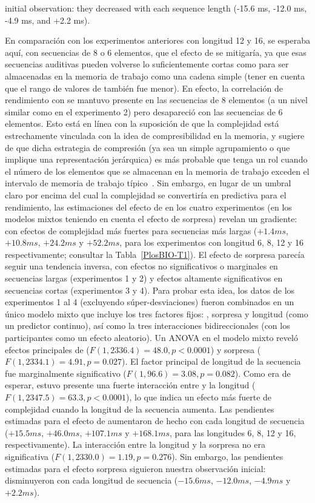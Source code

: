 initial observation: they decreased with each sequence length (-15.6 ms, -12.0 ms, -4.9 ms, and +2.2 ms).

En comparación con los experimentos anteriores con longitud 12 y 16, se esperaba aquí, con secuencias de 8 o 6 elementos, que el efecto de \mdlbin se mitigaría, ya que esas secuencias auditivas pueden volverse lo suficientemente cortas como para ser almacenadas en la memoria de trabajo como una cadena simple (tener en cuenta que el rango de valores de \mdlbin también fue menor). En efecto, la correlación de rendimiento con \mdlbin se mantuvo presente en las secuencias de 8 elementos (a un nivel similar como en el experimento 2) pero desapareció con las secuencias de 6 elementos. Esto está en línea con la suposición de que la complejidad está estrechamente vinculada con la idea de compresibilidad en la memoria, y sugiere de que dicha estrategia de compresión (ya sea un simple agrupamiento o que implique una representación jerárquica) es más probable que tenga un rol cuando el número de los elementos que se almacenan en la memoria de trabajo exceden el intervalo de memoria de trabajo típico~\cite{f16,f89}. Sin embargo, en lugar de un umbral claro por encima del cual la complejidad se convertiría en predictiva para el rendimiento, las estimaciones del efecto de \mdlbin en los cuatro experimentos (en los modelos mixtos teniendo en cuenta el efecto de sorpresa) revelan un gradiente: con efectos de complejidad más fuertes para secuencias más largas ($+1.4ms$, $+10.8ms$, $+24.2ms$ y $+52.2ms$, para los experimentos con longitud 6, 8, 12 y 16 respectivamente; consultar la Tabla~\ref{PlosBIO-T1}). El efecto de sorpresa parecía seguir una tendencia inversa, con efectos no significativos o marginales en secuencias largas (experimentos 1 y 2) y efectos altamente significativos en secuencias cortas (experimentos 3 y 4). Para probar esta idea, los datos de los experimentos 1 al 4 (excluyendo súper-desviaciones) fueron combinados en un único modelo mixto que incluye los tres factores fijos: \mdlbin, sorpresa y longitud (como un predictor continuo), así como la tres interacciones bidireccionales (con los participantes como un efecto aleatorio). Un ANOVA en el modelo mixto reveló efectos principales de \mdlbin ($F (1, 2336.4) = 48.0, p < 0.0001$) y sorpresa ($F (1, 2334.1) = 4.91, p = 0.027$). El factor principal de longitud de la secuencia fue marginalmente significativo ($F (1, 96.6) = 3.08, p = 0.082$). Como era de esperar, estuvo presente una fuerte interacción entre \mdlbin y la longitud ($F (1, 2347.5) = 63.3, p < 0.0001$), lo que indica un efecto más fuerte de complejidad cuando la longitud de la secuencia aumenta. Las pendientes estimadas para el efecto de \mdlbin aumentaron de hecho con cada longitud de secuencia ($+15.5ms$, $+46.0ms$, $+107.1ms$ y $+168.1ms$, para las longitudes 6, 8, 12 y 16, respectivamente). La interacción entre la longitud y la sorpresa no era significativa ($F (1, 2330.0) = 1.19, p = 0.276$). Sin embargo, las pendientes estimadas para el efecto sorpresa siguieron nuestra observación inicial: disminuyeron con cada longitud de secuencia ($-15.6ms$, $-12.0ms$, $-4.9ms$ y $+ 2.2ms$).

